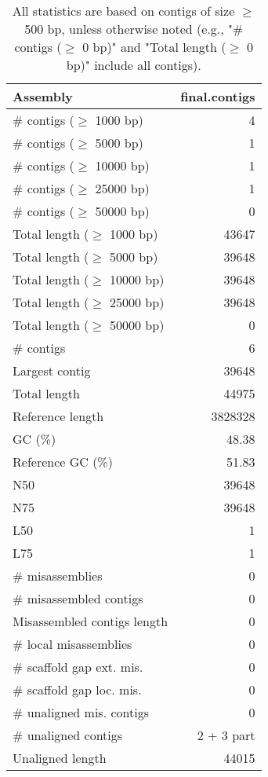\documentclass[12pt,a4paper]{article}
\begin{document}
\begin{table}[ht]
\begin{center}
\caption{All statistics are based on contigs of size $\geq$ 500 bp, unless otherwise noted (e.g., "\# contigs ($\geq$ 0 bp)" and "Total length ($\geq$ 0 bp)" include all contigs).}
\begin{tabular}{|l*{1}{|r}|}
\hline
Assembly & final.contigs \\ \hline
\# contigs ($\geq$ 1000 bp) & 4 \\ \hline
\# contigs ($\geq$ 5000 bp) & 1 \\ \hline
\# contigs ($\geq$ 10000 bp) & 1 \\ \hline
\# contigs ($\geq$ 25000 bp) & 1 \\ \hline
\# contigs ($\geq$ 50000 bp) & 0 \\ \hline
Total length ($\geq$ 1000 bp) & 43647 \\ \hline
Total length ($\geq$ 5000 bp) & 39648 \\ \hline
Total length ($\geq$ 10000 bp) & 39648 \\ \hline
Total length ($\geq$ 25000 bp) & 39648 \\ \hline
Total length ($\geq$ 50000 bp) & 0 \\ \hline
\# contigs & 6 \\ \hline
Largest contig & 39648 \\ \hline
Total length & 44975 \\ \hline
Reference length & 3828328 \\ \hline
GC (\%) & 48.38 \\ \hline
Reference GC (\%) & 51.83 \\ \hline
N50 & 39648 \\ \hline
N75 & 39648 \\ \hline
L50 & 1 \\ \hline
L75 & 1 \\ \hline
\# misassemblies & 0 \\ \hline
\# misassembled contigs & 0 \\ \hline
Misassembled contigs length & 0 \\ \hline
\# local misassemblies & 0 \\ \hline
\# scaffold gap ext. mis. & 0 \\ \hline
\# scaffold gap loc. mis. & 0 \\ \hline
\# unaligned mis. contigs & 0 \\ \hline
\# unaligned contigs & 2 + 3 part \\ \hline
Unaligned length & 44015 \\ \hline

\end{tabular}
\end{center}
\end{table}
\end{document}

